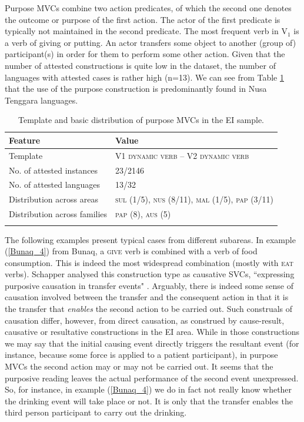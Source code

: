 Purpose MVCs combine two action predicates, of which the second one denotes the outcome or purpose of the first action. The actor of the first predicate is typically not maintained in the second predicate. The most frequent verb in V$_1$ is a verb of giving or putting. An actor transfers some object to another (group of) participant(s) in order for them to perform some other action. Given that the number of attested constructions is quite low in the dataset, the number of languages with attested cases is rather high (n=13). We can see from Table \ref{table:purpose} that the use of the purpose construction is predominantly found in Nusa Tenggara languages.

\begin{table}
\begin{tabular}{ll}
\lsptoprule
Feature&Value\tabularnewline
\hline
Template& V1 \textsc{dynamic verb} -- V2 \textsc{dynamic verb}\tabularnewline
No. of attested instances& 23/2146 \tabularnewline
No. of attested languages& 13/32 \tabularnewline
Distribution across areas& \textsc{sul} (1/5), \textsc{nus} (8/11), \textsc{mal} (1/5), \textsc{pap} (3/11) \tabularnewline
Distribution across families& \textsc{pap} (8), \textsc{aus} (5) \tabularnewline
\lspbottomrule
\end{tabular}
\caption[Template and basic distribution of purpose MVCs]{Template and basic distribution of purpose MVCs in the EI sample.}
\label{table:purpose}
\end{table}

The following examples present typical cases from different subareas. In example (\ref{Bunaq_4}) from Bunaq, a \textsc{give} verb is combined with a verb of food consumption. This is indeed the most widespread combination (mostly with \textsc{eat} verbs). Schapper analysed this construction type as causative SVCs, ``expressing purposive causation in transfer events" \citep[446]{schapper2009bunaq}. Arguably, there is indeed some sense of causation involved between the transfer and the consequent action in that it is the transfer that \emph{enables} the second action to be carried out. Such construals of causation differ, however, from direct causation, as construed by cause-result, causative or resultative constructions in the EI area. While in those constructions we may say that the initial causing event directly triggers the resultant event (for instance, because some force is applied to a patient participant), in purpose MVCs the second action may or may not be carried out. It seems that the purposive reading leaves the actual performance of the second event unexpressed. So, for instance, in example (\ref{Bunaq_4}) we do in fact not really know whether the drinking event will take place or not. It is only that the transfer enables the third person participant to carry out the drinking. 

